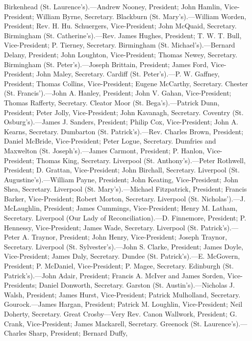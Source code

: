 Birkenhead (St. Laurence's).—Andrew Nooney,
President; John Hamlin, Vice-President; William Byrne, Secretary.
Blackburn (St. Mary's).—William Worden, President; Rev. H. Hu.
Schuergers, Vice-President; John McQuaid, Secretary. Birmingham (St.
Catherine's).—Rev. James Hughes, President; T. W. T. Bull,
Vice-President; P. Tierney, Secretary. Birmingham (St. Michael's).—Bernard
Delany, President; John Loughton, Vice-President; Thomas Newey,
Secretary. Birmingham (St. Peter's).—Joseph Brittain, President;
James Ford, Vice-President; John Maley, Secretary. Cardiff (St. Peter's).—P.
W. Gaffney, President; Thomas Collins, Vice-President; Eugene
McCarthy, Secretary. Chester (St. Francis').—John A. Hanley,
President; John V. Gahan, Vice-President; Thomas Rafferty, Secretary.
Cleator Moor (St. Bega's).—Patrick Dunn,
President; Peter Jolly, Vice-President; John Kavanagh, Secretary.
Coventry (St. Osburg's).—James J. Sanders, President; Philip Cox,
Vice-President; John A. Kearns, Secretary. Dumbarton (St. Patrick's).—Rev.
Charles Brown, President; Daniel McBride, Vice-President; Peter Logue,
Secretary. Dumfries and Maxwelton (St. Joseph's).—James Carmont,
President; P. Hanlon, Vice-President; Thomas King, Secretary.
Liverpool (St. Anthony's).—Peter Rothwell, President; D. Grattan,
Vice-President; John Birchall, Secretary. Liverpool (St. Augustine's).—William
Payne, President; John Keating, Vice-President; John Shea, Secretary.
Liverpool (St. Mary's).—Michael Fitzpatrick, President; Francis
Barker, Vice-President; Robert Morton, Secretary. Liverpool (St.
Nicholas').—J. McLaughlin, President; James Cummings,
Vice-President; Henry M. Latham, Secretary. Liverpool (Our Lady of
Reconciliation).—D. Finnemore, President; P. Hennessy,
Vice-President; James Wade, Secretary. Liverpool (St. Patrick's).—Peter
A. Traynor, President; John Henry, Vice-President; Joseph Traynor,
Secretary. Liverpool (St. Sylvester's).—John S. Clarke, President;
James Doyle, Vice-President; James Daly, Secretary. Dundee (St.
Patrick's).—E. McGovern, President; P. McDaniel, Vice-President; P.
Magee, Secretary. Edinburgh (St. Patrick's).—John Adair, President;
Francis A. McIver and James Sorden, Vice-Presidents; Daniel Donworth,
Secretary. Garston (St. Austin's).—Nicholas J. Walsh, President;
James Hurst, Vice-President; Patrick Mulholland, Secretary. Gourock.—James
Hargan, President; Patrick M. Loughlin, Vice-President; Neil Doherty,
Secretary. Great Crosby—Very Rev. Canon Wallwork, President; G.
Crank, Vice-President; James Mackarell, Secretary. Greenock (St.
Laurence's).—Charles Sharp, President; Bernard Duffy,
